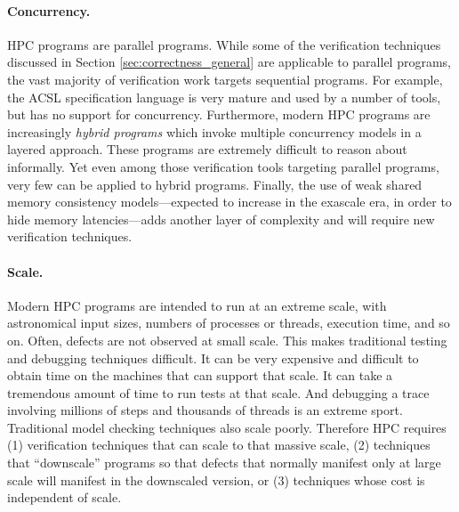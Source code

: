 \paragraph{Concurrency.}
HPC programs are parallel programs.  While some of the verification techniques discussed in Section \ref{sec:correctness_general} are applicable to parallel programs, the vast majority of verification work targets sequential programs. For example, the ACSL specification language is very mature and used by a number of tools, but has no support for concurrency.  Furthermore, modern HPC programs are increasingly \emph{hybrid programs} which invoke multiple concurrency models in a layered approach.  These programs are extremely difficult to reason about informally.  Yet even among those verification tools targeting parallel programs, very few can be applied to hybrid programs.  Finally, the use of weak shared memory consistency models---expected to increase in the exascale era, in order to hide memory latencies---adds another layer of complexity and will require new verification techniques.


\paragraph{Scale.}
Modern HPC programs are intended to run at an extreme scale, with astronomical input sizes, numbers of processes or threads, execution time, and so on.  Often, defects are not observed at small scale.  This makes traditional testing and debugging techniques difficult.  It can be very expensive and difficult to obtain time on the machines that can support that scale.  It can take a tremendous amount of time to run tests at that scale.  And debugging a trace involving millions of steps and thousands of threads is an extreme sport.  Traditional model checking techniques also scale poorly.  Therefore HPC requires (1) verification techniques that can scale to that massive scale, (2) techniques that ``downscale'' programs so that defects that normally manifest only at large scale will manifest in the downscaled version, or (3) techniques whose cost is independent of scale.


